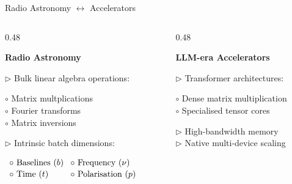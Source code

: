 \documentclass{beamer}
\newcommand{\bayesgridblock}[3][1.72cm]{%
  \begin{beamerboxesrounded}[upper=block title,lower=block body,shadow=true,width=\linewidth]{\textbf{#2}}
    \small
    \parbox[t][#1][t]{0.94\linewidth}{\raggedright #3\par}
  \end{beamerboxesrounded}
}
\begin{document}
\begin{frame}{Radio Astronomy $\leftrightarrow$ Accelerators}
\vspace{-0.6em}
\begin{columns}[T,totalwidth=\textwidth]
\begin{column}{0.48\textwidth}
{
\bayesgridblock[4.70cm]{Radio Astronomy}{%
\(\triangleright\) Bulk linear algebra operations:\\[0.25em]
\vspace{0.80em}
{\raggedright
\hspace{0.50em} \(\circ\) Matrix multplications\\[0.15em]
\hspace{0.50em} \(\circ\) Fourier transforms\\[0.15em]
\hspace{0.50em} \(\circ\) Matrix inversions\par}
\vspace{1.00em}
\(\triangleright\) Intrinsic batch dimensions:\\[0.35em]
\vspace{0.80em}
{\centering
\(
\begin{array}{@{}l@{\hspace{0.8em}}l@{}}
\hspace{0.50em} \circ\ \text{Baselines}\ (b) & \circ\ \text{Frequency}\ (\nu)\\[0.15em]
\hspace{0.50em} \circ\ \text{Time}\ (t) & \circ\ \text{Polarisation}\ (p)
\end{array}
\)\par}
}
}
\end{column}
\begin{column}{0.48\textwidth}
{
\bayesgridblock[2.10cm]{LLM-era Accelerators}{%
\(\triangleright\) Transformer architectures:\\[0.12em]
{\raggedright\footnotesize
\hspace{0.50em} \(\circ\) Dense matrix multiplication\\[0.10em]
\hspace{0.50em} \(\circ\) Specialised tensor cores\par}
\vspace{0.12em}
\(\triangleright\) High-bandwidth memory\\[0.18em]
\(\triangleright\) Native multi-device scaling
}
}


\end{column}
\end{columns}
\end{frame}
\end{document}
